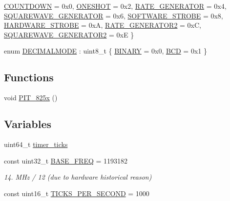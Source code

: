\begin{DoxyCompactItemize}
\hyperlink{namespace_t_i_m_e_r_a3231391ecc5f5895452fcc54c5fabe26a06efb23533d3d7e51cd3326db82146e1}{C\+O\+U\+N\+T\+D\+O\+WN} = 0x0, 
\hyperlink{namespace_t_i_m_e_r_a3231391ecc5f5895452fcc54c5fabe26a5402554577b28ae2338dd6c9c0df375f}{O\+N\+E\+S\+H\+OT} = 0x2, 
\hyperlink{namespace_t_i_m_e_r_a3231391ecc5f5895452fcc54c5fabe26a97f3074fdfb64cf0447db4462d1ffb3d}{R\+A\+T\+E\+\_\+\+G\+E\+N\+E\+R\+A\+T\+OR} = 0x4, 
\hyperlink{namespace_t_i_m_e_r_a3231391ecc5f5895452fcc54c5fabe26a0ba7addb1833eb3dca07bab98dbe39b4}{S\+Q\+U\+A\+R\+E\+W\+A\+V\+E\+\_\+\+G\+E\+N\+E\+R\+A\+T\+OR} = 0x6, 
\newline
\hyperlink{namespace_t_i_m_e_r_a3231391ecc5f5895452fcc54c5fabe26a2c24c25d57016104dab42aa010f31ef8}{S\+O\+F\+T\+W\+A\+R\+E\+\_\+\+S\+T\+R\+O\+BE} = 0x8, 
\hyperlink{namespace_t_i_m_e_r_a3231391ecc5f5895452fcc54c5fabe26a38141ffb893bfea01739585eb563945c}{H\+A\+R\+D\+W\+A\+R\+E\+\_\+\+S\+T\+R\+O\+BE} = 0xA, 
\hyperlink{namespace_t_i_m_e_r_a3231391ecc5f5895452fcc54c5fabe26a223f042f6282d268b1e7e6edc8533597}{R\+A\+T\+E\+\_\+\+G\+E\+N\+E\+R\+A\+T\+O\+R2} = 0xC, 
\hyperlink{namespace_t_i_m_e_r_a3231391ecc5f5895452fcc54c5fabe26aecafb2f20488e9be37636c247f073181}{S\+Q\+U\+A\+R\+E\+W\+A\+V\+E\+\_\+\+G\+E\+N\+E\+R\+A\+T\+O\+R2} = 0xE
 \}
\item 
enum \hyperlink{namespace_t_i_m_e_r_aa762d05daed3ea97420e855a5d03253d}{D\+E\+C\+I\+M\+A\+L\+M\+O\+DE} \+: uint8\+\_\+t \{ \hyperlink{namespace_t_i_m_e_r_aa762d05daed3ea97420e855a5d03253da99f5fa2a10e384e9980cc7b9d2053094}{B\+I\+N\+A\+RY} = 0x0, 
\hyperlink{namespace_t_i_m_e_r_aa762d05daed3ea97420e855a5d03253dac8b1953c3a3129fb92120b332014a43a}{B\+CD} = 0x1
 \}
\end{DoxyCompactItemize}
\subsection*{Functions}
\begin{DoxyCompactItemize}
\item 
void \hyperlink{namespace_t_i_m_e_r_a9914c0026a4661367482a01e7834500e}{P\+I\+T\+\_\+825x} ()
\end{DoxyCompactItemize}
\subsection*{Variables}
\begin{DoxyCompactItemize}
\item 
uint64\+\_\+t \hyperlink{namespace_t_i_m_e_r_a403ab666b1023ff9771d1b1c9fed0015}{timer\+\_\+ticks}
\item 
const uint32\+\_\+t \hyperlink{namespace_t_i_m_e_r_a5e00501463f93ce13bbbc8b9798cdc2c}{B\+A\+S\+E\+\_\+\+F\+R\+EQ} = 1\textquotesingle{}193\textquotesingle{}182
\begin{DoxyCompactList}\small\item\em 14. M\+Hz / 12 (due to hardware historical reason) \end{DoxyCompactList}\item 
const uint16\+\_\+t \hyperlink{namespace_t_i_m_e_r_aae36b4824645d9f2f506cd1199817117}{T\+I\+C\+K\+S\+\_\+\+P\+E\+R\+\_\+\+S\+E\+C\+O\+ND} = 1\textquotesingle{}000
\end{DoxyCompactItemize}


